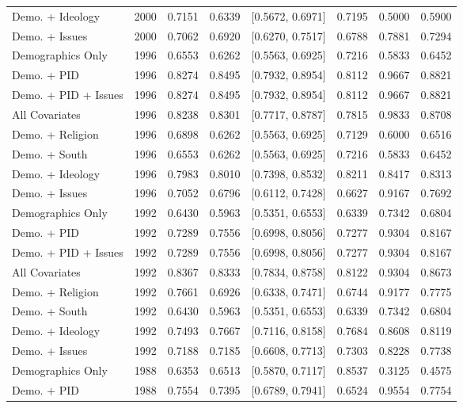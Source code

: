 \begin{longtable}{lrrrlrrr}
  Demo. + Ideology & 2000 & 0.7151 & 0.6339 & [0.5672, 0.6971] & 0.7195 & 0.5000 & 0.5900 \\ 
  Demo. + Issues & 2000 & 0.7062 & 0.6920 & [0.6270, 0.7517] & 0.6788 & 0.7881 & 0.7294 \\ 
  Demographics Only & 1996 & 0.6553 & 0.6262 & [0.5563, 0.6925] & 0.7216 & 0.5833 & 0.6452 \\ 
  Demo. + PID & 1996 & 0.8274 & 0.8495 & [0.7932, 0.8954] & 0.8112 & 0.9667 & 0.8821 \\ 
  Demo. + PID + Issues & 1996 & 0.8274 & 0.8495 & [0.7932, 0.8954] & 0.8112 & 0.9667 & 0.8821 \\ 
  All Covariates & 1996 & 0.8238 & 0.8301 & [0.7717, 0.8787] & 0.7815 & 0.9833 & 0.8708 \\ 
  Demo. + Religion & 1996 & 0.6898 & 0.6262 & [0.5563, 0.6925] & 0.7129 & 0.6000 & 0.6516 \\ 
  Demo. + South & 1996 & 0.6553 & 0.6262 & [0.5563, 0.6925] & 0.7216 & 0.5833 & 0.6452 \\ 
  Demo. + Ideology & 1996 & 0.7983 & 0.8010 & [0.7398, 0.8532] & 0.8211 & 0.8417 & 0.8313 \\ 
  Demo. + Issues & 1996 & 0.7052 & 0.6796 & [0.6112, 0.7428] & 0.6627 & 0.9167 & 0.7692 \\ 
  Demographics Only & 1992 & 0.6430 & 0.5963 & [0.5351, 0.6553] & 0.6339 & 0.7342 & 0.6804 \\ 
  Demo. + PID & 1992 & 0.7289 & 0.7556 & [0.6998, 0.8056] & 0.7277 & 0.9304 & 0.8167 \\ 
  Demo. + PID + Issues & 1992 & 0.7289 & 0.7556 & [0.6998, 0.8056] & 0.7277 & 0.9304 & 0.8167 \\ 
  All Covariates & 1992 & 0.8367 & 0.8333 & [0.7834, 0.8758] & 0.8122 & 0.9304 & 0.8673 \\ 
  Demo. + Religion & 1992 & 0.7661 & 0.6926 & [0.6338, 0.7471] & 0.6744 & 0.9177 & 0.7775 \\ 
  Demo. + South & 1992 & 0.6430 & 0.5963 & [0.5351, 0.6553] & 0.6339 & 0.7342 & 0.6804 \\ 
  Demo. + Ideology & 1992 & 0.7493 & 0.7667 & [0.7116, 0.8158] & 0.7684 & 0.8608 & 0.8119 \\ 
  Demo. + Issues & 1992 & 0.7188 & 0.7185 & [0.6608, 0.7713] & 0.7303 & 0.8228 & 0.7738 \\ 
  Demographics Only & 1988 & 0.6353 & 0.6513 & [0.5870, 0.7117] & 0.8537 & 0.3125 & 0.4575 \\ 
  Demo. + PID & 1988 & 0.7554 & 0.7395 & [0.6789, 0.7941] & 0.6524 & 0.9554 & 0.7754 \\ 

\end{longtable}
